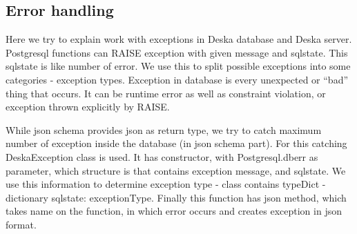 \documentclass[deska]{subfiles}
\begin{document}
\subsection{Error handling}
Here we try to explain work with exceptions in Deska database and Deska server. Postgresql functions can RAISE exception with given message and sqlstate.
This sqlstate is like number of error. We use this to split possible exceptions into some categories - exception types. Exception in database is
every unexpected or “bad” thing that occurs. It can be runtime error as well as constraint violation, or exception thrown explicitly by RAISE.

While json schema provides json as return type, we try to catch maximum number of exception inside the database (in
json schema part).
For this catching DeskaException class is used. It has constructor, with Postgresql.dberr as parameter, which structure is that contains exception
message, and sqlstate. We use this information to determine exception type - class contains typeDict - dictionary {sqlstate: exceptionType}.
Finally this function has json method, which takes name on the function, in which error occurs and creates exception in json format.
\end{document}
